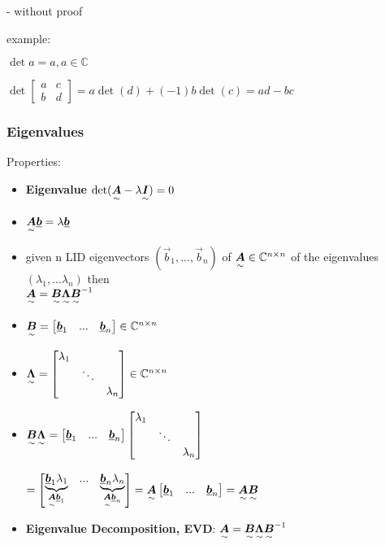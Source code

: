 \begin{flushright}- without proof\end{flushright}

example:

\quad$\det a=a, a\in\mathbb{C}$

\quad $\det \begin{bmatrix}a&c\\b&d\end{bmatrix} = a\det(d)+(-1)b\det(c)=ad-bc$


\subsubsection{Eigenvalues}

Properties: 
\begin{itemize}
\item \textbf{Eigenvalue} $\det(\ma{A}-\lambda\ma{I})=0$
\item $\ma{A}\vec{b}=\lambda\vec{b}$
\item given n LID eigenvectors $(\vec{b}_1,...,\vec{b}_n)$ of $\ma{A}\in\mathbb{C}^{n\times n}$ of the eigenvalues $(\lambda_1,...\lambda_n)$ then\\ $\ma{A}=\ma{B}\ma{\Lambda}\ma{B}^{-1}$ 
\item $\ma{B}=\begin{bmatrix}\vec{b}_1&...&\vec{b}_n\end{bmatrix}\in\mathbb{C}^{n\times n} $
\item $\ma{\Lambda}=\begin{bmatrix}\lambda_1& & \\ &\ddots & \\ & &\lambda_n\end{bmatrix} \in \mathbb{C}^{n\times n}$
\item $\ma{B}\ma{\Lambda}=\begin{bmatrix}\vec{b}_1&...&\vec{b}_n\end{bmatrix} 
\begin{bmatrix}\lambda_1& & \\ &\ddots & \\ & &\lambda_n\end{bmatrix}$

$=\begin{bmatrix}\underbrace{\vec{b}_1\lambda_1}_{\ma{A}\vec{b}_1}&...&\underbrace{\vec{b}_n\lambda_n}_{\ma{A}\vec{b}_n}\end{bmatrix}=\ma{A}\begin{bmatrix}\vec{b}_1&...&\vec{b}_n\end{bmatrix}=\ma{A}\ma{B}$
\item \textbf{Eigenvalue Decomposition, EVD}: $\ma{A}=\ma{B}\ma{\Lambda}\ma{B}^{-1}$
\end{itemize}

